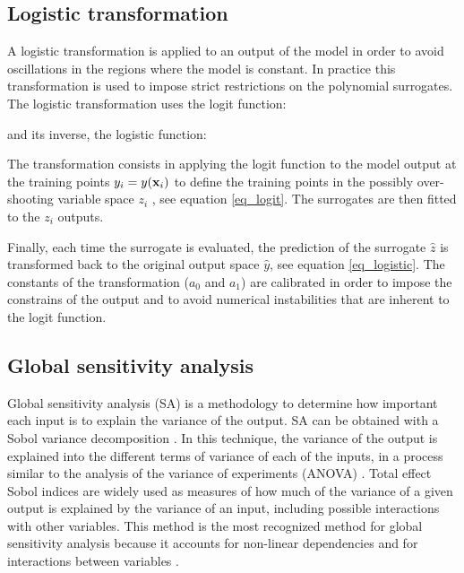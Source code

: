 \documentclass[preprint,12pt]{elsarticle}
\begin{document}
\subsection{Logistic transformation}

A logistic transformation is applied to an output of the model in order to avoid oscillations in the regions where the model is constant. In practice this transformation is used to impose strict restrictions on the polynomial surrogates. The logistic transformation uses the logit function:


\noindent and its inverse, the logistic function:


The transformation consists in applying the logit function to the model output at the training points $y_i=y(\mathbf{x}_i)$ to define the training points in the possibly over-shooting variable space $z_i$ \cite{simard1998transformation}, see equation \ref{eq_logit}. The surrogates are then fitted to the $z_i$ outputs.


Finally, each time the surrogate is evaluated, the prediction of the surrogate $\hat{z}$ is transformed back to the original output space $\hat{y}$, see equation \ref{eq_logistic}. The constants of the transformation ($a_0$ and $a_1$) are calibrated in order to impose the constrains of the output and to avoid numerical instabilities that are inherent to the logit function.



\subsection{Global sensitivity analysis}

Global sensitivity analysis (SA) is a methodology to determine how important each input is to explain the variance of the output. SA can be obtained with a Sobol variance decomposition \cite{sobol2001global}. In this technique, the variance of the output is explained into the different terms of variance of each of the inputs, in a process similar to the analysis of the variance of experiments (ANOVA) \cite{maxwell2004designing}. Total effect Sobol indices are widely used as measures of how much of the variance of a given output is explained by the variance of an input, including possible interactions with other variables. This method is the most recognized method for global sensitivity analysis because it accounts for non-linear dependencies and for interactions between variables \cite{saltelli2010variance}.
\end{document}
